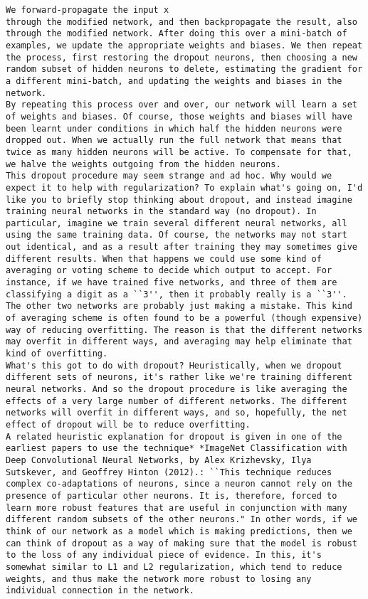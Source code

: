 \begin{lstlisting}
We forward-propagate the input x
through the modified network, and then backpropagate the result, also through the modified network. After doing this over a mini-batch of examples, we update the appropriate weights and biases. We then repeat the process, first restoring the dropout neurons, then choosing a new random subset of hidden neurons to delete, estimating the gradient for a different mini-batch, and updating the weights and biases in the network.
By repeating this process over and over, our network will learn a set of weights and biases. Of course, those weights and biases will have been learnt under conditions in which half the hidden neurons were dropped out. When we actually run the full network that means that twice as many hidden neurons will be active. To compensate for that, we halve the weights outgoing from the hidden neurons.
This dropout procedure may seem strange and ad hoc. Why would we expect it to help with regularization? To explain what's going on, I'd like you to briefly stop thinking about dropout, and instead imagine training neural networks in the standard way (no dropout). In particular, imagine we train several different neural networks, all using the same training data. Of course, the networks may not start out identical, and as a result after training they may sometimes give different results. When that happens we could use some kind of averaging or voting scheme to decide which output to accept. For instance, if we have trained five networks, and three of them are classifying a digit as a ``3'', then it probably really is a ``3''. The other two networks are probably just making a mistake. This kind of averaging scheme is often found to be a powerful (though expensive) way of reducing overfitting. The reason is that the different networks may overfit in different ways, and averaging may help eliminate that kind of overfitting.
What's this got to do with dropout? Heuristically, when we dropout different sets of neurons, it's rather like we're training different neural networks. And so the dropout procedure is like averaging the effects of a very large number of different networks. The different networks will overfit in different ways, and so, hopefully, the net effect of dropout will be to reduce overfitting.
A related heuristic explanation for dropout is given in one of the earliest papers to use the technique* *ImageNet Classification with Deep Convolutional Neural Networks, by Alex Krizhevsky, Ilya Sutskever, and Geoffrey Hinton (2012).: ``This technique reduces complex co-adaptations of neurons, since a neuron cannot rely on the presence of particular other neurons. It is, therefore, forced to learn more robust features that are useful in conjunction with many different random subsets of the other neurons." In other words, if we think of our network as a model which is making predictions, then we can think of dropout as a way of making sure that the model is robust to the loss of any individual piece of evidence. In this, it's somewhat similar to L1 and L2 regularization, which tend to reduce weights, and thus make the network more robust to losing any individual connection in the network.

\end{lstlisting}
